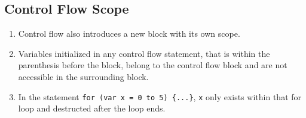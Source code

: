 \subsection{Control Flow Scope}
\begin{enumerate}
	\item Control flow also introduces a new block with its own scope.
	\item Variables initialized in any control flow statement, that is within the parenthesis before the block, belong to the control flow block and are not accessible in the surrounding block.
	\item In the statement \lstinline|for (var x = 0 to 5) {...}|, \texttt{x} only exists within that for loop and destructed after the loop ends.
\end{enumerate}
 
 

